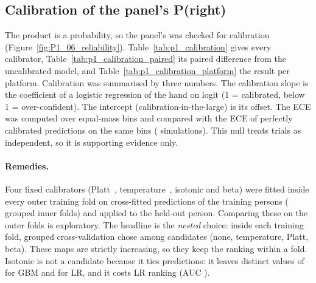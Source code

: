 \subsection{Calibration of the panel's P(right)}\label{app:prep:calibration}

The product is a probability, so the panel's \pright{} was checked for calibration
(Figure~\ref{fig:P1_06_reliability}). Table~\ref{tab:p1_calibration} gives every calibrator,
Table~\ref{tab:p1_calibration_paired} its paired difference from the uncalibrated model, and
Table~\ref{tab:p1_calibration_platform} the result per platform.
Calibration was summarised by three numbers. The calibration slope is the coefficient of a logistic
regression of the hand on logit \pright{} (1 = calibrated, below 1 = over-confident). The intercept
(calibration-in-the-large) is its offset. The ECE was computed over  equal-mass bins and
compared with the ECE of perfectly calibrated predictions on the same bins (
simulations). This null treats trials as independent, so it is supporting evidence only.

\paragraph{Remedies.} Four fixed calibrators (Platt~\cite{platt1999probabilistic},
temperature~\cite{guo2017calibration}, isotonic and beta) were fitted inside every outer training fold on
cross-fitted predictions of the training persons ( grouped inner folds) and applied to
the held-out person. Comparing these  on the outer folds is exploratory. The
headline is the \emph{nested} choice: inside each training fold, grouped cross-validation chose among
 candidates (none, temperature, Platt, beta). These maps are strictly increasing, so
they keep the ranking within a fold. Isotonic is not a candidate because it ties predictions: it leaves
 distinct values of  for GBM and
 for LR, and it costs LR ranking (AUC ).

